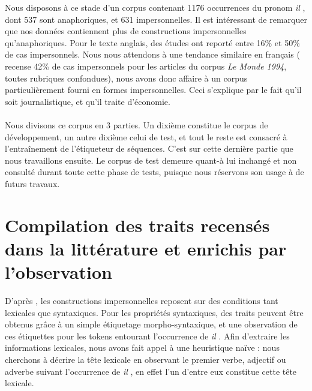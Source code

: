 \documentclass[a4paper,12pt]{article}
\begin{document}
Nous disposons à ce stade d'un corpus contenant 1176 occurrences du pronom \og \textit{il} \fg{}, dont 537 sont anaphoriques, et 631 impersonnelles. Il est intéressant de remarquer que nos données contiennent plus de constructions impersonnelles qu'anaphoriques. Pour le texte anglais, des études \citep{gundel} ont reporté entre 16\% et 50\% de cas impersonnels. Nous nous attendons à une tendance similaire en français (\citeauthor{danlos-ilimp-taln2005} recense 42\% de cas impersonnels pour les articles du corpus \textit{Le Monde 1994}, toutes rubriques confondues), nous avons donc affaire à un corpus particulièrement fourni en formes impersonnelles. Ceci s'explique par le fait qu'il soit journalistique, et qu'il traite d'économie.

\paragraph{}
Nous divisons ce corpus en 3 parties. Un dixième constitue le corpus de développement, un autre dixième celui de test, et tout le reste est consacré à l'entraînement de l'étiqueteur de séquences.
C'est sur cette dernière partie que nous travaillons ensuite.
Le corpus de test demeure quant-à lui inchangé et non consulté durant toute cette phase de tests, puisque nous réservons son usage à de futurs travaux.

\section{Compilation des traits recensés dans la littérature et enrichis par l'observation}
\label{approche-traits}

D'après \citeauthor{danlos-ilimp-taln2005}, les constructions impersonnelles reposent sur des conditions tant lexicales que syntaxiques. Pour les propriétés syntaxiques, des traits peuvent \^etre obtenus grâce à un simple étiquetage morpho-syntaxique, et une observation de ces étiquettes pour les tokens entourant l'occurrence de \og \textit{il} \fg{}. Afin d'extraire les informations lexicales, nous avons fait appel à une heuristique naïve : nous cherchons à décrire la tête lexicale en observant le premier verbe, adjectif ou adverbe suivant l'occurrence de \og \textit{il} \fg{}, en effet l'un d'entre eux constitue cette tête lexicale.
\end{document}
